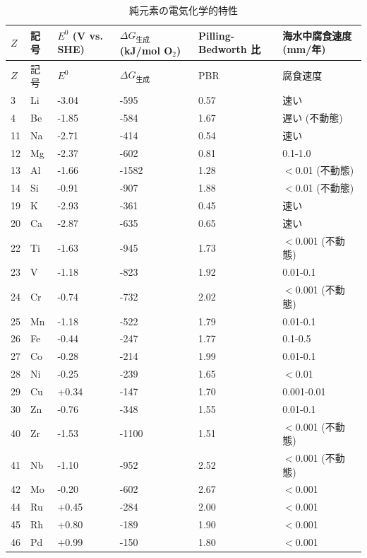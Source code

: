 \documentclass[11pt,a4paper]{article}
\theoremstyle{remark}
\begin{document}
	\begin{longtable}{p{0.8cm}p{1.2cm}p{2.5cm}p{2.5cm}p{2.5cm}p{2.5cm}}
		\caption{純元素の電気化学的特性} \label{tab:electrochemical-properties-func} \\
		\toprule
		\(Z\) & 記号 & \(E^0\) (V vs. SHE) & \(\Delta G_{\text{生成}}\) (kJ/mol O\(_2\)) & Pilling-Bedworth 比 & 海水中腐食速度 (mm/年) \\
		\midrule
		\endfirsthead
		\toprule
		\(Z\) & 記号 & \(E^0\) & \(\Delta G_{\text{生成}}\) & PBR & 腐食速度 \\
		\midrule
		\endhead
		3  & Li & -3.04 & -595 & 0.57 & 速い \\
		4  & Be & -1.85 & -584 & 1.67 & 遅い (不動態) \\
		11 & Na & -2.71 & -414 & 0.54 & 速い \\
		12 & Mg & -2.37 & -602 & 0.81 & 0.1-1.0 \\
		13 & Al & -1.66 & -1582 & 1.28 & $<$0.01 (不動態) \\
		14 & Si & -0.91 & -907 & 1.88 & $<$0.01 (不動態) \\
		19 & K  & -2.93 & -361 & 0.45 & 速い \\
		20 & Ca & -2.87 & -635 & 0.65 & 速い \\
		22 & Ti & -1.63 & -945 & 1.73 & $<$0.001 (不動態) \\
		23 & V  & -1.18 & -823 & 1.92 & 0.01-0.1 \\
		24 & Cr & -0.74 & -732 & 2.02 & $<$0.001 (不動態) \\
		25 & Mn & -1.18 & -522 & 1.79 & 0.01-0.1 \\
		26 & Fe & -0.44 & -247 & 1.77 & 0.1-0.5 \\
		27 & Co & -0.28 & -214 & 1.99 & 0.01-0.1 \\
		28 & Ni & -0.25 & -239 & 1.65 & $<$0.01 \\
		29 & Cu & +0.34 & -147 & 1.70 & 0.001-0.01 \\
		30 & Zn & -0.76 & -348 & 1.55 & 0.01-0.1 \\
		40 & Zr & -1.53 & -1100 & 1.51 & $<$0.001 (不動態) \\
		41 & Nb & -1.10 & -952 & 2.52 & $<$0.001 (不動態) \\
		42 & Mo & -0.20 & -602 & 2.67 & $<$0.001 \\
		44 & Ru & +0.45 & -284 & 2.00 & $<$0.001 \\
		45 & Rh & +0.80 & -189 & 1.90 & $<$0.001 \\
		46 & Pd & +0.99 & -150 & 1.80 & $<$0.001 \\

\end{longtable}
\end{document}
